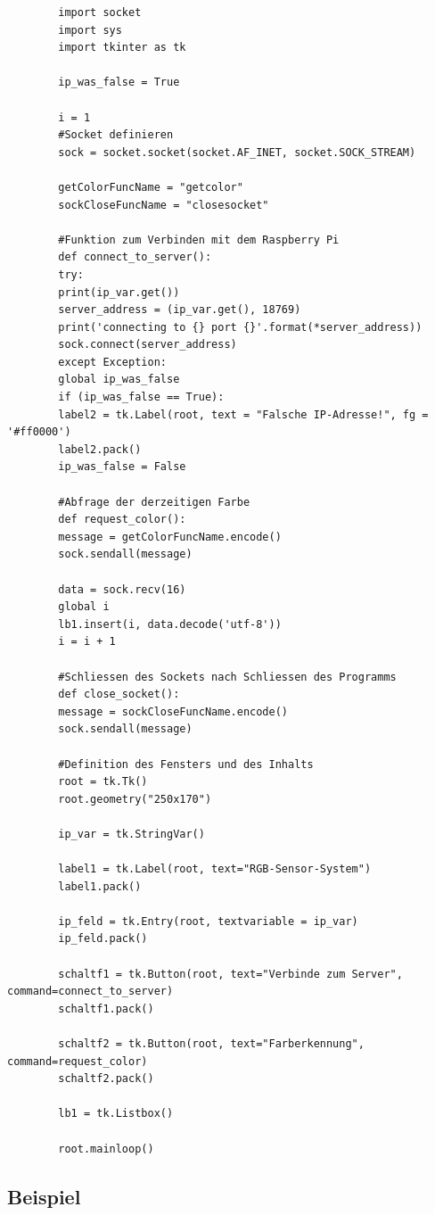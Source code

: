 \documentclass[12pt, a4paper]{article}
\begin{document}
	\newpage
	\begin{lstlisting}
		import socket
		import sys
		import tkinter as tk
		
		ip_was_false = True
		
		i = 1
		#Socket definieren
		sock = socket.socket(socket.AF_INET, socket.SOCK_STREAM)
		
		getColorFuncName = "getcolor"
		sockCloseFuncName = "closesocket"
		
		#Funktion zum Verbinden mit dem Raspberry Pi
		def connect_to_server():
		try:
		print(ip_var.get())
		server_address = (ip_var.get(), 18769)
		print('connecting to {} port {}'.format(*server_address))
		sock.connect(server_address)
		except Exception:
		global ip_was_false
		if (ip_was_false == True):
		label2 = tk.Label(root, text = "Falsche IP-Adresse!", fg = '#ff0000')
		label2.pack()
		ip_was_false = False
		
		#Abfrage der derzeitigen Farbe
		def request_color():
		message = getColorFuncName.encode()
		sock.sendall(message)
		
		data = sock.recv(16)
		global i
		lb1.insert(i, data.decode('utf-8'))
		i = i + 1
		
		#Schliessen des Sockets nach Schliessen des Programms
		def close_socket():
		message = sockCloseFuncName.encode()
		sock.sendall(message)
		
		#Definition des Fensters und des Inhalts
		root = tk.Tk()
		root.geometry("250x170")
		
		ip_var = tk.StringVar()
		
		label1 = tk.Label(root, text="RGB-Sensor-System")
		label1.pack()
		
		ip_feld = tk.Entry(root, textvariable = ip_var)
		ip_feld.pack()
		
		schaltf1 = tk.Button(root, text="Verbinde zum Server", command=connect_to_server)
		schaltf1.pack()
		
		schaltf2 = tk.Button(root, text="Farberkennung", command=request_color)
		schaltf2.pack()
		
		lb1 = tk.Listbox()
		
		root.mainloop()
	\end{lstlisting}
	\newpage
	\subsection{Beispiel}
\end{document}
